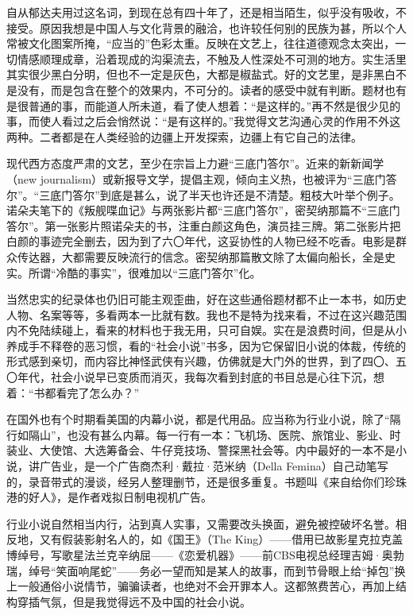 \par 自从郁达夫用过这名词，到现在总有四十年了，还是相当陌生，似乎没有吸收，不接受。原因我想是中国人与文化背景的融洽，也许较任何别的民族为甚，所以个人常被文化图案所掩，“应当的”色彩太重。反映在文艺上，往往道德观念太突出，一切情感顺理成章，沿着现成的沟渠流去，不触及人性深处不可测的地方。实生活里其实很少黑白分明，但也不一定是灰色，大都是椒盐式。好的文艺里，是非黑白不是没有，而是包含在整个的效果内，不可分的。读者的感受中就有判断。题材也有是很普通的事，而能道人所未道，看了使人想着：“是这样的。”再不然是很少见的事，而使人看过之后会悄然说：“是有这样的。”我觉得文艺沟通心灵的作用不外这两种。二者都是在人类经验的边疆上开发探索，边疆上有它自己的法律。
\par 现代西方态度严肃的文艺，至少在宗旨上力避“三底门答尔”。近来的新新闻学（new journalism）或新报导文学，提倡主观，倾向主义热，也被评为“三底门答尔”。“三底门答尔”到底是甚么，说了半天也许还是不清楚。粗枝大叶举个例子。诺朵夫笔下的《叛舰喋血记》与两张影片都“三底门答尔”，密契纳那篇不“三底门答尔”。第一张影片照诺朵夫的书，注重白颜这角色，演员挂三牌。第二张影片把白颜的事迹完全删去，因为到了六〇年代，这妥协性的人物已经不吃香。电影是群众传达器，大都需要反映流行的信念。密契纳那篇散文除了太偏向船长，全是史实。所谓“冷酷的事实”，很难加以“三底门答尔”化。
\par 当然忠实的纪录体也仍旧可能主观歪曲，好在这些通俗题材都不止一本书，如历史人物、名案等等，多看两本一比就有数。我也不是特为找来看，不过在这兴趣范围内不免陆续碰上，看来的材料也于我无用，只可自娱。实在是浪费时间，但是从小养成手不释卷的恶习惯，看的“社会小说”书多，因为它保留旧小说的体裁，传统的形式感到亲切，而内容比神怪武侠有兴趣，仿佛就是大门外的世界，到了四〇、五〇年代，社会小说早已变质而消灭，我每次看到封底的书目总是心往下沉，想着：“书都看完了怎么办？”
\par 在国外也有个时期看美国的内幕小说，都是代用品。应当称为行业小说，除了“隔行如隔山”，也没有甚么内幕。每一行有一本：飞机场、医院、旅馆业、影业、时装业、大使馆、大选筹备会、牛仔竞技场、警探黑社会等。内中最好的一本不是小说，讲广告业，是一个广告商杰利·戴拉·范米纳（Della Femina）自己动笔写的，录音带式的漫谈，经另人整理删节，还是很多重复。书题叫《来自给你们珍珠港的好人》，是作者戏拟日制电视机广告。
\par 行业小说自然相当内行，沾到真人实事，又需要改头换面，避免被控破坏名誉。相反地，又有假装影射名人的，如《国王》（The King）——借用已故影星克拉克盖博绰号，写歌星法兰克辛纳屈——《恋爱机器》——前CBS电视总经理吉姆·奥勃瑞，绰号“笑面响尾蛇”——务必一望而知是某人的故事，而到节骨眼上给“掉包”换上一般通俗小说情节，骗骗读者，也绝对不会开罪本人。这都煞费苦心，再加上结构穿插气氛，但是我觉得远不及中国的社会小说。
